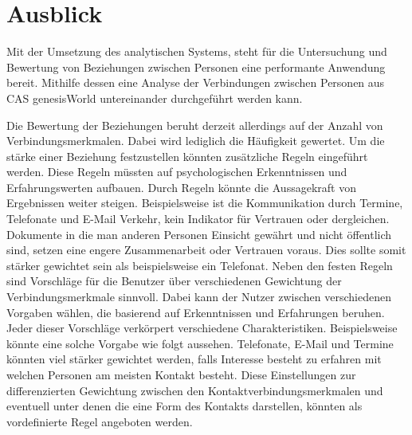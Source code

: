 \section{Ausblick}
\label{ch:Ergebnis:sec:Ausblick}

Mit der Umsetzung des analytischen Systems, steht für die Untersuchung und Bewertung von Beziehungen zwischen Personen eine performante Anwendung bereit. Mithilfe dessen eine Analyse der Verbindungen zwischen  Personen aus CAS genesisWorld untereinander durchgeführt werden kann.  

Die Bewertung der Beziehungen beruht derzeit allerdings auf der Anzahl von Verbindungsmerkmalen. Dabei wird lediglich die Häufigkeit gewertet. Um die stärke einer Beziehung festzustellen könnten zusätzliche Regeln eingeführt werden. Diese Regeln müssten auf psychologischen Erkenntnissen und Erfahrungswerten aufbauen. Durch Regeln könnte die Aussagekraft von Ergebnissen weiter steigen. Beispielsweise ist die Kommunikation durch Termine, Telefonate und E-Mail Verkehr, kein Indikator für Vertrauen oder dergleichen. Dokumente in die man anderen Personen Einsicht gewährt und nicht öffentlich sind, setzen eine engere Zusammenarbeit oder Vertrauen voraus. Dies sollte somit stärker gewichtet sein als beispielsweise ein Telefonat. Neben den festen Regeln sind Vorschläge für die Benutzer über verschiedenen Gewichtung der Verbindungsmerkmale sinnvoll. Dabei kann der Nutzer zwischen verschiedenen Vorgaben wählen, die basierend auf Erkenntnissen und Erfahrungen beruhen. Jeder dieser Vorschläge verkörpert verschiedene Charakteristiken. Beispielsweise könnte eine solche Vorgabe wie folgt aussehen. Telefonate, E-Mail und Termine könnten viel stärker gewichtet werden, falls Interesse besteht zu erfahren mit welchen Personen am meisten Kontakt besteht. Diese Einstellungen zur differenzierten Gewichtung zwischen den Kontaktverbindungsmerkmalen und eventuell unter denen die eine Form des Kontakts darstellen, könnten als vordefinierte Regel angeboten werden.

